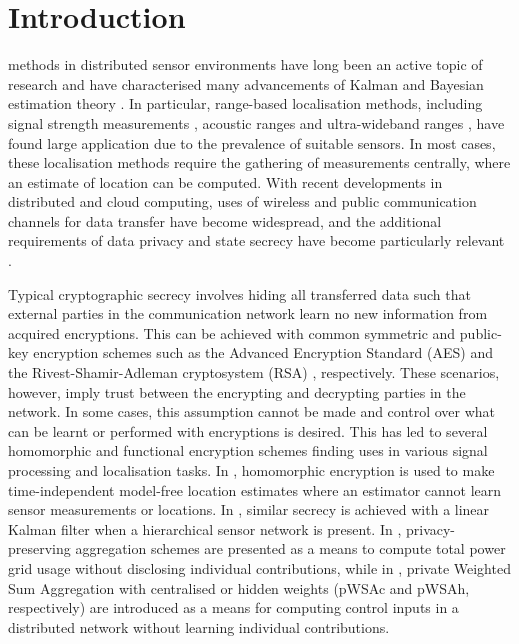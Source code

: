 \documentclass[10pt,letterpaper,oneside,twocolumn,journal]{IEEEtran}
\theoremstyle{definition}
\theoremstyle{definition}
\theoremstyle{remark}
\begin{document}
\section{Introduction} \label{sec:introduction}
 methods in distributed sensor environments have long been an active topic of research \cite{pierceIntroductionLoran1946,ligginsDistributedDataFusion2012,liContributedReviewSourcelocalization2016} and have characterised many advancements of Kalman and Bayesian estimation theory \cite{mutambaraDecentralizedEstimationControl1998}. In particular, range-based localisation methods, including signal strength measurements \cite{wangConvexCombinationSource2018,heRangeFreeLocalizationSchemes2003}, acoustic ranges \cite{beutlerNewNonlinearFiltering2004} and ultra-wideband ranges \cite{geziciLocalizationUltraWidebandRadios2005}, have found large application due to the prevalence of suitable sensors. In most cases, these localisation methods require the gathering of measurements centrally, where an estimate of location can be computed. With recent developments in distributed and cloud computing, uses of wireless and public communication channels for data transfer have become widespread, and the additional requirements of data privacy and state secrecy have become particularly relevant \cite{brennerSecretProgramExecution2011,renSecurityChallengesPublic2012}.

Typical cryptographic secrecy involves hiding all transferred data such that external parties in the communication network learn no new information from acquired encryptions. This can be achieved with common symmetric and public-key encryption schemes such as the Advanced Encryption Standard (AES) \cite{gueronIntelAdvancedEncryption2010} and the Rivest-Shamir-Adleman cryptosystem (RSA) \cite{rivestMethodObtainingDigital1978}, respectively. These scenarios, however, imply trust between the encrypting and decrypting parties in the network. In some cases, this assumption cannot be made and control over what can be learnt or performed with encryptions is desired. This has led to several homomorphic and functional encryption schemes \cite{paillierPublicKeyCryptosystemsBased1999,shiPrivacyPreservingAggregationTimeSeries2011,joyeScalableSchemePrivacyPreserving2013,chotardDecentralizedMultiClientFunctional2018} finding uses in various signal processing and localisation tasks. In \cite{alanwarPrOLocResilientLocalization2017}, homomorphic encryption is used to make time-independent model-free location estimates where an estimator cannot learn sensor measurements or locations. In \cite{aristovEncryptedMultisensorInformation2018}, similar secrecy is achieved with a linear Kalman filter when a hierarchical sensor network is present. In \cite{shiPrivacyPreservingAggregationTimeSeries2011,joyeScalableSchemePrivacyPreserving2013}, privacy-preserving aggregation schemes are presented as a means to compute total power grid usage without disclosing individual contributions, while in \cite{alexandruEncryptedCooperativeControl2019,alexandruPrivateWeightedSum2020}, private Weighted Sum Aggregation with centralised or hidden weights (pWSAc and pWSAh, respectively) are introduced as a means for computing control inputs in a distributed network without learning individual contributions.
\end{document}
